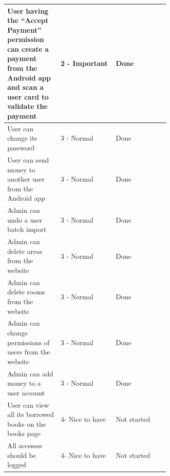 \documentclass[11pt,a4paper]{report}
\begin{document}
\begin{longtable}[c]{|p{0.33\linewidth}|l|p{0.33\linewidth}|}
User having the “Accept Payment” permission can create a payment from the Android app and scan a user card to validate the payment             & 2 - Important     & Done                                             \\ \hline
User can change its password                                                                                                                   & 3 - Normal        & Done                                             \\ \hline
User can send money to another user from the Android app                                                                                       & 3 - Normal        & Done                                             \\ \hline
Admin can undo a user batch import                                                                                                             & 3 - Normal        & Done                                             \\ \hline
Admin can delete areas from the website                                                                                                        & 3 - Normal        & Done                                             \\ \hline
Admin can delete rooms from the website                                                                                                        & 3 - Normal        & Done                                             \\ \hline
Admin can change permissions of users from the website                                                                                         & 3 - Normal        & Done                                             \\ \hline
Admin can add money to a user account                                                                                                          & 3 - Normal        & Done                                             \\ \hline
User can view all its borrowed books on the books page                                                                                         & 4- Nice to have   & Not started                                      \\ \hline
All accesses should be logged                                                                                                                  & 4- Nice to have   & Not started                                      \\ \hline

\end{longtable}
\end{document}
